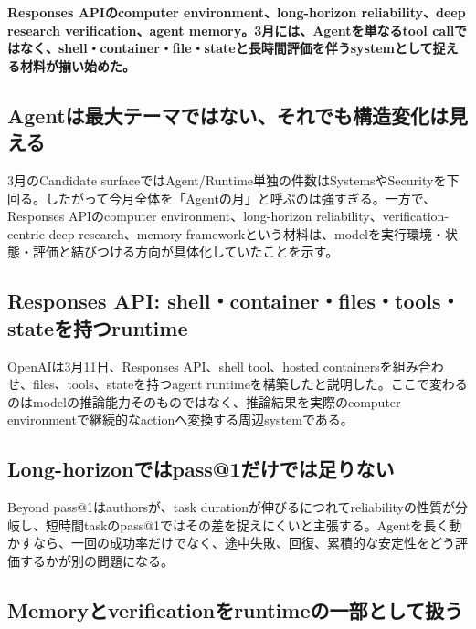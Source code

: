 \noindent\textbf{Responses APIのcomputer environment、long-horizon reliability、deep research verification、agent memory。3月には、Agentを単なるtool callではなく、shell・container・file・stateと長時間評価を伴うsystemとして捉える材料が揃い始めた。}\autocite{src-01572b4c34e9,src-0ec537ec1cc1,src-2b8b39e5cae3,src-42318ebdee75}

\subsection{Agentは最大テーマではない、それでも構造変化は見える}

3月のCandidate surfaceではAgent/Runtime単独の件数はSystemsやSecurityを下回る。したがって今月全体を「Agentの月」と呼ぶのは強すぎる。一方で、Responses APIのcomputer environment、long-horizon reliability、verification-centric deep research、memory frameworkという材料は、modelを実行環境・状態・評価と結びつける方向が具体化していたことを示す。\autocite{src-01572b4c34e9,src-0ec537ec1cc1,src-2b8b39e5cae3,src-42318ebdee75}


\subsection{Responses API: shell・container・files・tools・stateを持つruntime}

OpenAIは3月11日、Responses API、shell tool、hosted containersを組み合わせ、files、tools、stateを持つagent runtimeを構築したと説明した。ここで変わるのはmodelの推論能力そのものではなく、推論結果を実際のcomputer environmentで継続的なactionへ変換する周辺systemである。\autocite{src-01572b4c34e9}


\subsection{Long-horizonではpass@1だけでは足りない}

Beyond pass@1はauthorsが、task durationが伸びるにつれてreliabilityの性質が分岐し、短時間taskのpass@1ではその差を捉えにくいと主張する。Agentを長く動かすなら、一回の成功率だけでなく、途中失敗、回復、累積的な安定性をどう評価するかが別の問題になる。\autocite{src-0ec537ec1cc1}


\subsection{Memoryとverificationをruntimeの一部として扱う}

